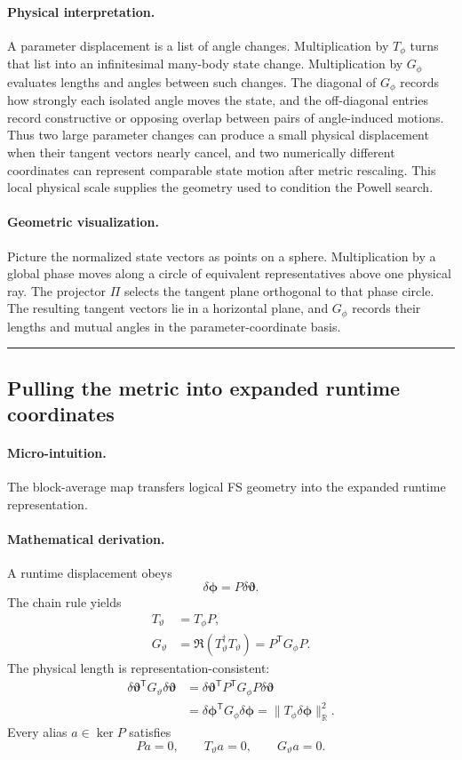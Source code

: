 \documentclass[10pt,twocolumn]{article}
\newcommand{\R}{\mathbb R}
\newcommand{\conceptbreak}{%
  \par\medskip\noindent
  {\color{black!30}\rule{\columnwidth}{0.35pt}}%
  \par\medskip}
\newcommand{\micro}{\paragraph{Micro-intuition.}}
\newcommand{\mathderiv}{\paragraph{Mathematical derivation.}}
\newcommand{\physical}{\paragraph{Physical interpretation.}}
\newcommand{\geometryblock}{\paragraph{Geometric visualization.}}
\begin{document}
\physical A parameter displacement is a list of angle changes. Multiplication
by \(T_\phi\) turns that list into an infinitesimal many-body state change.
Multiplication by \(G_\phi\) evaluates lengths and angles between such changes.
The diagonal of \(G_\phi\) records how strongly each isolated angle moves the
state, and the off-diagonal entries record constructive or opposing overlap
between pairs of angle-induced motions. Thus two large parameter changes can
produce a small physical displacement when their tangent vectors nearly
cancel, and two numerically different coordinates can represent comparable
state motion after metric rescaling. This local physical scale supplies the
geometry used to condition the Powell search.

\geometryblock Picture the normalized state vectors as points on a sphere.
Multiplication by a global phase moves along a circle of equivalent
representatives above one physical ray. The projector \(\Pi\) selects the
tangent plane orthogonal to that phase circle. The resulting tangent vectors lie in a
horizontal plane, and \(G_\phi\) records their lengths and mutual angles in the
parameter-coordinate basis.

\conceptbreak

\subsection*{Pulling the metric into expanded runtime coordinates}

\micro The block-average map transfers logical FS geometry into the expanded
runtime representation.

\mathderiv A runtime displacement obeys
\begin{equation}
\delta\bm\phi=P\delta\bm\vartheta.
\label{eq:runtime-to-logical-displacement}
\end{equation}
The chain rule yields
\begin{align}
T_\vartheta
&=T_\phi P,\nonumber\\
G_\vartheta
&=\Re(T_\vartheta^\dagger T_\vartheta)
=P^{\mathsf T}G_\phi P.
\label{eq:runtime-pullback}
\end{align}
The physical length is representation-consistent:
\begin{align}
\delta\bm\vartheta^{\mathsf T}G_\vartheta
\delta\bm\vartheta
&=\delta\bm\vartheta^{\mathsf T}P^{\mathsf T}G_\phi
P\delta\bm\vartheta\nonumber\\
&=\delta\bm\phi^{\mathsf T}G_\phi\delta\bm\phi
=\|T_\phi\delta\bm\phi\|_{\R}^2.
\label{eq:pullback-length}
\end{align}
Every alias \(a\in\ker P\) satisfies
\begin{equation}
Pa=0,\qquad T_\vartheta a=0,\qquad G_\vartheta a=0.
\label{eq:alias-nullity}
\end{equation}
\end{document}
